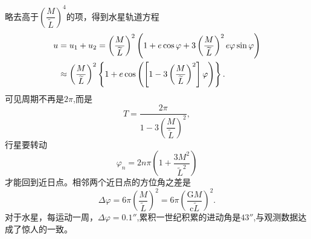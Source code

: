 \documentclass[11pt, a4paper, oneside, onecolumn]{ctexart}
\numberwithin{equation}{subsection}
\begin{document}
略去高于$\left(\dfrac{M}{\widetilde{L}}\right)^{4}$的项，得到水星轨道方程
\begin{align}
u&=u_{1}+u_{2}=\left(\frac{M}{\widetilde{L}}\right)^{2}\left(1+e\cos\varphi+3\left(\frac{M}{\widetilde{L}}\right)^{2}e\varphi\sin\varphi\right)\notag\\
&\approx\left(\frac{M}{\widetilde{L}}\right)^{2}\left\{1+e\cos\left(\left[1-3\left(\frac{M}{\widetilde{L}}\right)^{2}\right]\varphi\right)\right\}.
\end{align}
可见周期不再是$2\pi$,而是
\begin{equation}
T=\frac{2\pi}{1-3\left(\dfrac{M}{\widetilde{L}}\right)^{2}},
\end{equation}
行星要转动
\begin{equation}
\varphi_{n}=2n\pi\left(1+\frac{3M^{2}}{\widetilde{L}^{2}}\right)
\end{equation}
才能回到近日点。相邻两个近日点的方位角之差是
\begin{equation}
\Delta{}\varphi=6\pi\left(\frac{M}{\widetilde{L}}\right)^{2}=6\pi\left(\frac{\mathrm{G}M}{\mathrm{c}\widetilde{L}}\right)^{2}.
\end{equation}
对于水星，每运动一周，$\Delta{}\varphi=\ang{;;0.1}$,累积一世纪积累的进动角是$\ang{;;43}$,与观测数据达成了惊人的一致。
\end{document}
